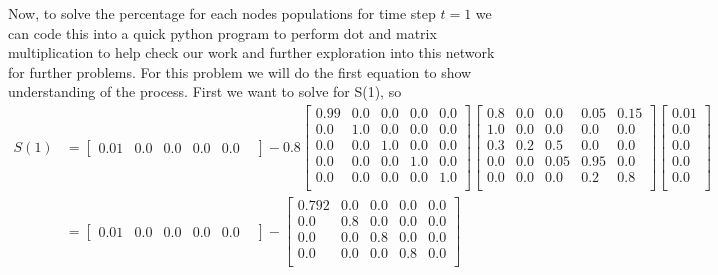 \documentclass[11pt]{article}
\begin{document}
{\begin{enumerate}
\begin{center}
\end{center}
Now, to solve the percentage for each nodes populations for time step $t=1$ we can code this into a quick python program to perform dot and matrix multiplication to help check our work and further exploration into this network for further problems.  For this problem we will do the first equation to show understanding of the process.  First we want to solve for S(1), so\\
\begin{align*}
	S(1) &=
		\begin{bmatrix} 
		0.01   &
		0.0 	&
		0.0 	&
		0.0 	&
		0.0 	&
		\end{bmatrix}
		 - 0.8 
		\begin{bmatrix} 
		0.99  & 0.0 & 0.0 & 0.0 & 0.0 \\
		0.0  & 1.0 & 0.0 & 0.0   & 0.0 \\
		0.0  & 0.0 & 1.0 & 0.0 & 0.0 \\
		0.0  & 0 .0 & 0.0 & 1.0 & 0.0 \\
		0.0  & 0 .0 & 0.0 & 0.0 & 1.0 \\
		\end{bmatrix}
		\begin{bmatrix} 
		0.8  & 0.0 & 0.0 & 0.05 & 0.15 \\
		1.0  & 0.0 & 0.0 & 0.0   & 0.0 \\
		0.3  & 0.2 & 0.5 & 0.0 & 0.0 \\
		0.0  & 0 .0 & 0.05 & 0.95 & 0.0 \\
		0.0  & 0 .0 & 0.0 & 0.2 & 0.8 \\
		\end{bmatrix}
		\begin{bmatrix} 
		0.01 \\
		0.0 	\\
		0.0 	\\
		0.0 	\\
		0.0 	\\
		\end{bmatrix}\\
&=
		\begin{bmatrix} 
		0.01   &
		0.0 	&
		0.0 	&
		0.0 	&
		0.0 	&
		\end{bmatrix}
		 - 
		\begin{bmatrix} 
		0.792  & 0.0 & 0.0 & 0.0 & 0.0 \\
		0.0  & 0.8 & 0.0 & 0.0   & 0.0 \\
		0.0  & 0.0 & 0.8 & 0.0 & 0.0 \\
		0.0  & 0 .0 & 0.0 & 0.8 & 0.0 \\

\end{bmatrix}
\end{align*}
\end{enumerate}}
\end{document}

